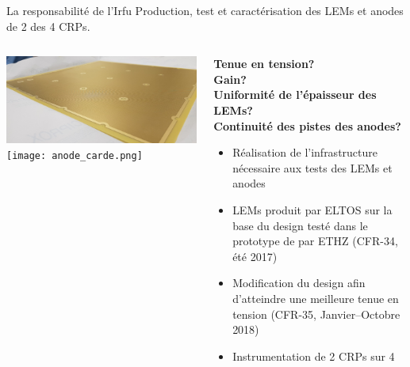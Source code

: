     \begin{frame}{La responsabilité de l'Irfu}
        \centering Production, test et caractérisation des LEMs et anodes de 2 des 4 CRPs.\\\vfill
    	\begin{scriptsize}
        	\begin{columns}
            	\begin{column}{0.5\textwidth}
                	\includegraphics[width=\textwidth]{./pictures/LEM.png}\\
                   	\texttt{[image: anode\_carde.png]}
            	\end{column}
       	        \begin{column}{0.5\textwidth}
           	        \textbf{Tenue en tension?\\
           	        Gain?\\
           	        Uniformité de l'épaisseur des LEMs?\\
           	        Continuité des pistes des anodes?\\}\vspace{0.3cm}
           	        \begin{itemize}
               	        \item Réalisation de l'infrastructure nécessaire aux tests des LEMs et anodes
               	        \item LEMs produit par ELTOS sur la base du design testé dans le prototype de \threeL{} par ETHZ (CFR-34, été 2017)
               	        \item Modification du design afin d'atteindre une meilleure tenue en tension (CFR-35, Janvier--Octobre 2018)
               	        \item Instrumentation de 2 CRPs sur 4
           	        \end{itemize}
       	        \end{column}
        	\end{columns}
   		\end{scriptsize}
    \end{frame}
    

